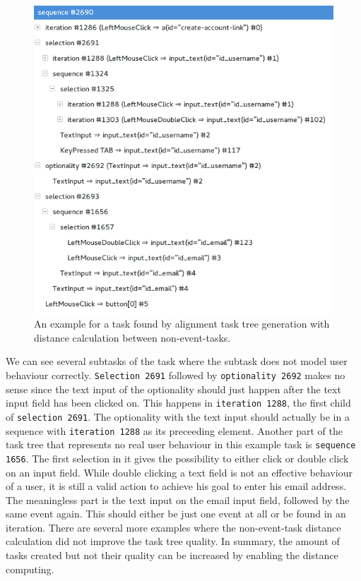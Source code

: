 \begin{figure}[h]
	\centering
	\includegraphics[scale=0.75]{chapters/casestudy/noneventcreateaccount.png}
	\caption{An example for a task found by alignment task tree generation with distance calculation between non-event-tasks.}
	\label{fig:noneventaccountcreation}
\end{figure}
We can see several subtasks of the task where the subtask does not model user behaviour correctly.
\texttt{Selection 2691} followed by \texttt{optionality 2692} makes no sense since the text input of the optionality should just happen after the text input field has been clicked on.
This happens in \texttt{iteration 1288}, the first child of \texttt{selection 2691}. 
The optionality with the text input should actually be in a sequence with \texttt{iteration 1288} as its preceeding element.
Another part of the task tree that represents no real user behaviour in this example task is \texttt{sequence 1656}.
The first selection in it gives the possibility to either click or double click on an input field.
While double clicking a text field is not an effective behaviour of a user, it is still a valid action to achieve his goal to enter his email address.
The meaningless part is the text input on the email input field, followed by the same event again. This should either be just one event at all or be found in an iteration.
There are several more examples where the non-event-task distance calculation did not improve the task tree quality.
In summary, the amount of tasks created but not their quality can be increased by enabling the distance computing.

